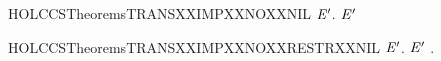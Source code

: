 \newcommand{\HOLCCSTheoremsTRANSXXFV}{\UseVerbatim{HOLCCSTheoremsTRANSXXFV}}
\begin{SaveVerbatim}{HOLCCSTheoremsTRANSXXIMPXXNOXXNIL}
\HOLTokenTurnstile{} \HOLSymConst{\HOLTokenForall{}}  \ensuremath{\HOLBoundVar{E}\sp{\prime{}}}.  \HOLTokenTransBegin{}\HOLTokenTransEnd \ensuremath{\HOLBoundVar{E}\sp{\prime{}}} \HOLSymConst{\HOLTokenImp{}}  \HOLSymConst{\HOLTokenNotEqual{}} 
\end{SaveVerbatim}
\newcommand{\HOLCCSTheoremsTRANSXXIMPXXNOXXNIL}{\UseVerbatim{HOLCCSTheoremsTRANSXXIMPXXNOXXNIL}}
\begin{SaveVerbatim}{HOLCCSTheoremsTRANSXXIMPXXNOXXRESTRXXNIL}
\HOLTokenTurnstile{} \HOLSymConst{\HOLTokenForall{}}  \ensuremath{\HOLBoundVar{E}\sp{\prime{}}}.  \HOLTokenTransBegin{}\HOLTokenTransEnd \ensuremath{\HOLBoundVar{E}\sp{\prime{}}} \HOLSymConst{\HOLTokenImp{}} \HOLSymConst{\HOLTokenForall{}}.  \HOLSymConst{\HOLTokenNotEqual{}}   
\end{SaveVerbatim}
\newcommand{\HOLCCSTheoremsTRANSXXIMPXXNOXXRESTRXXNIL}{\UseVerbatim{HOLCCSTheoremsTRANSXXIMPXXNOXXRESTRXXNIL}}
